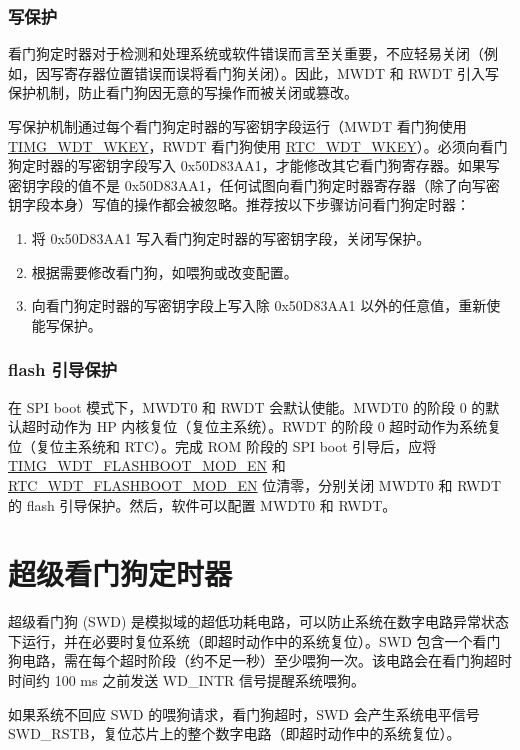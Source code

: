 \documentclass[main\_\_CN.tex]{subfiles}
\begin{document}
\subsubsection{写保护}
看门狗定时器对于检测和处理系统或软件错误而言至关重要，不应轻易关闭（例如，因写寄存器位置错误而误将看门狗关闭）。因此，MWDT 和 RWDT 引入写保护机制，防止看门狗因无意的写操作而被关闭或篡改。

写保护机制通过每个看门狗定时器的写密钥字段运行（MWDT 看门狗使用 \hyperref[fielddesc:TIMGWDTWKEY]{TIMG\_WDT\_WKEY}，RWDT 看门狗使用 \hyperref[fielddesc:RTCWDTWKEY]{RTC\_WDT\_WKEY}）。必须向看门狗定时器的写密钥字段写入 0x50D83AA1，才能修改其它看门狗寄存器。如果写密钥字段的值不是 0x50D83AA1，任何试图向看门狗定时器寄存器（除了向写密钥字段本身）写值的操作都会被忽略。推荐按以下步骤访问看门狗定时器：

\begin{enumerate}
\item 将 0x50D83AA1 写入看门狗定时器的写密钥字段，关闭写保护。
\item 根据需要修改看门狗，如喂狗或改变配置。
\item 向看门狗定时器的写密钥字段上写入除 0x50D83AA1 以外的任意值，重新使能写保护。
\end{enumerate}

\subsubsection{flash 引导保护}
在 SPI boot 模式下，MWDT0 和 RWDT 会默认使能。MWDT0 的阶段 0 的默认超时动作为 HP 内核复位（复位主系统）。RWDT 的阶段 0 超时动作为系统复位（复位主系统和 RTC）。完成 ROM 阶段的 SPI boot 引导后，应将 \hyperref[fielddesc:TIMGWDTFLASHBOOTMODEN]{TIMG\_WDT\_FLASHBOOT\_MOD\_EN} 和 \hyperref[fielddesc:RTCWDTFLASHBOOTMODEN]{RTC\_WDT\_FLASHBOOT\_MOD\_EN} 位清零，分别关闭 MWDT0 和 RWDT 的 flash 引导保护。然后，软件可以配置 MWDT0 和 RWDT。

\section{超级看门狗定时器}\label{sec:wdt-swdt}
超级看门狗 (SWD) 是模拟域的超低功耗电路，可以防止系统在数字电路异常状态下运行，并在必要时复位系统（即超时动作中的系统复位）。SWD 包含一个看门狗电路，需在每个超时阶段（约不足一秒）至少喂狗一次。该电路会在看门狗超时时间约 100 ms 之前发送 WD\_INTR 信号提醒系统喂狗。

如果系统不回应 SWD 的喂狗请求，看门狗超时，SWD 会产生系统电平信号 SWD\_RSTB，复位芯片上的整个数字电路（即超时动作中的系统复位）。
\end{document}
